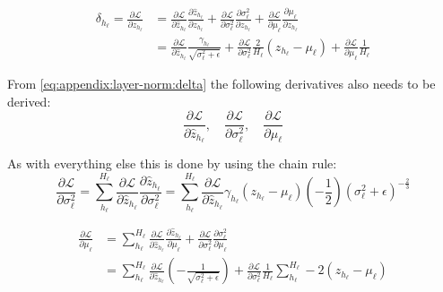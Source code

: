 \begin{equation}
\begin{aligned}
\delta_{h_\ell} = \frac{\partial \mathcal{L}}{\partial z_{h_\ell}} &= \frac{\partial \mathcal{L}}{\partial \hat{z}_{h_\ell}} \frac{\partial \hat{z}_{h_\ell}}{\partial z_{h_\ell}} + \frac{\partial \mathcal{L}}{\partial \sigma_{\ell}^2} \frac{\partial \sigma_{\ell}^2}{\partial z_{h_\ell}} + \frac{\partial \mathcal{L}}{\partial \mu_{\ell}} \frac{\partial \mu_{\ell}}{\partial z_{h_\ell}} \\
&= \frac{\partial \mathcal{L}}{\partial \hat{z}_{h_\ell}} \frac{\gamma_{h_\ell}}{\sqrt{\sigma_{\ell}^2 + \epsilon}} + \frac{\partial \mathcal{L}}{\partial \sigma_{\ell}^2} \frac{2}{H_\ell}\left(z_{h_\ell} - \mu_{\ell}\right) + \frac{\partial \mathcal{L}}{\partial \mu_{\ell}} \frac{1}{H_\ell}
\end{aligned}
\label{eq:appendix:layer-norm:delta}
\end{equation}

From \eqref{eq:appendix:layer-norm:delta} the following derivatives also needs to be derived:
\begin{equation}
\frac{\partial \mathcal{L}}{\partial \hat{z}_{h_\ell}}, \quad \frac{\partial \mathcal{L}}{\partial \sigma_{\ell}^2}, \quad \frac{\partial \mathcal{L}}{\partial \mu_{\ell}}
\end{equation}

As with everything else this is done by using the chain rule:
\begin{equation}
\frac{\partial \mathcal{L}}{\partial \sigma^2_\ell} = \sum_{h_\ell}^{H_\ell} \frac{\partial \mathcal{L}}{\partial \hat{z}_{h_\ell}} \frac{\partial \hat{z}_{h_\ell}}{\partial \sigma_\ell^2} = \sum_{h_\ell}^{H_\ell} \frac{\partial \mathcal{L}}{\partial \hat{z}_{h_\ell}} \gamma_{h_\ell} (z_{h_\ell} - \mu_\ell) \left(- \frac{1}{2}\right) \left(\sigma_\ell^2 + \epsilon\right)^{-\frac{2}{3}}
\end{equation}

\begin{equation}
\begin{aligned}
\frac{\partial \mathcal{L}}{\partial \mu_\ell} &= \sum_{h_\ell}^{H_\ell} \frac{\partial \mathcal{L}}{\partial \hat{z}_{h_\ell}} \frac{\partial \hat{z}_{h_\ell}}{\partial \mu_\ell} + \frac{\partial \mathcal{L}}{\partial \sigma_{\ell}^2} \frac{\partial \sigma_\ell^2}{\partial \mu_\ell} \\
&= \sum_{h_\ell}^{H_\ell} \frac{\partial \mathcal{L}}{\partial \hat{z}_{h_\ell}} \left(- \frac{1}{\sqrt{\sigma_\ell^2 + \epsilon}}\right) + \frac{\partial \mathcal{L}}{\partial \sigma_{\ell}^2} \frac{1}{H_\ell} \sum_{h_\ell}^{H_\ell} -2 \left(z_{h_\ell} - \mu_\ell\right)
\end{aligned}
\end{equation}

